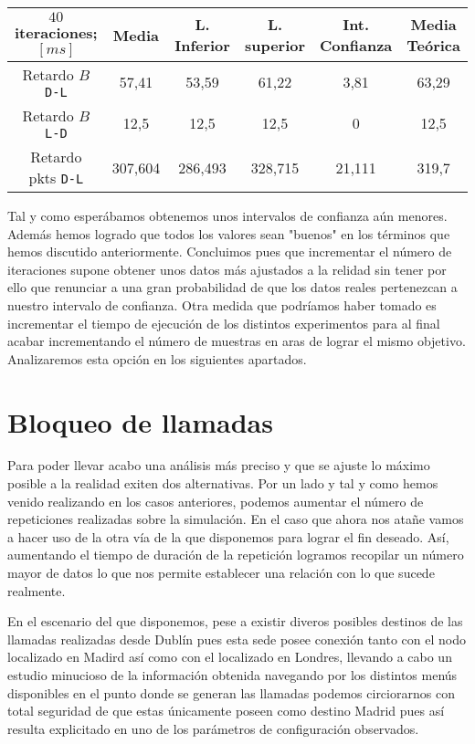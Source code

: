 \documentclass{article}[10pt]
\begin{document}
		\vskip 3mm

		\begin{tabular}{| c | c | c | c | c | c |}
			\hline
			$40$ iteraciones; $[ms]$ & Media & L. Inferior & L. superior & Int. Confianza & Media Teórica\\
			\hline
			Retardo $B$ \texttt{D-L} & 57,41 & 53,59 & 61,22 & 3,81 & 63,29\\
			\hline
			Retardo $B$ \texttt{L-D} & 12,5 & 12,5 & 12,5 & 0 & 12,5\\
			\hline
			Retardo pkts \texttt{D-L} & 307,604 & 286,493 & 328,715 & 21,111 & 319,7\\
			\hline
		\end{tabular}

		\vskip 3mm

		Tal y como esperábamos obtenemos unos intervalos de confianza aún menores. Además hemos logrado que todos los valores sean "buenos" en los términos que hemos discutido anteriormente. Concluimos pues que incrementar el número de iteraciones supone obtener unos datos más ajustados a la relidad sin tener por ello que renunciar a una gran probabilidad de que los datos reales pertenezcan a nuestro intervalo de confianza. Otra medida que podríamos haber tomado es incrementar el tiempo de ejecución de los distintos experimentos para al final acabar incrementando el número de muestras en aras de lograr el mismo objetivo. Analizaremos esta opción en los siguientes apartados.

	\section{Bloqueo de llamadas}
		Para poder llevar acabo una análisis más preciso y que se ajuste lo máximo posible a la realidad exiten dos alternativas. Por un lado y tal y como hemos venido realizando en los casos anteriores, podemos aumentar el número de repeticiones realizadas sobre la simulación. En el caso que ahora nos atañe vamos a hacer uso de la otra vía de la que disponemos para lograr el fin deseado. Así, aumentando el tiempo de duración de la repetición logramos recopilar un número mayor de datos lo que nos permite establecer una relación con lo que sucede realmente.

		En el escenario del que disponemos, pese a existir diveros posibles destinos de las llamadas realizadas desde Dublín pues esta sede posee conexión tanto con el nodo localizado en Madird así como con el localizado en Londres, llevando a cabo un estudio minucioso de la información obtenida navegando por los distintos menús disponibles en el punto donde se generan las llamadas podemos circiorarnos con total seguridad de que estas únicamente poseen como destino Madrid pues así resulta explicitado en uno de los parámetros de configuración observados.
\end{document}
